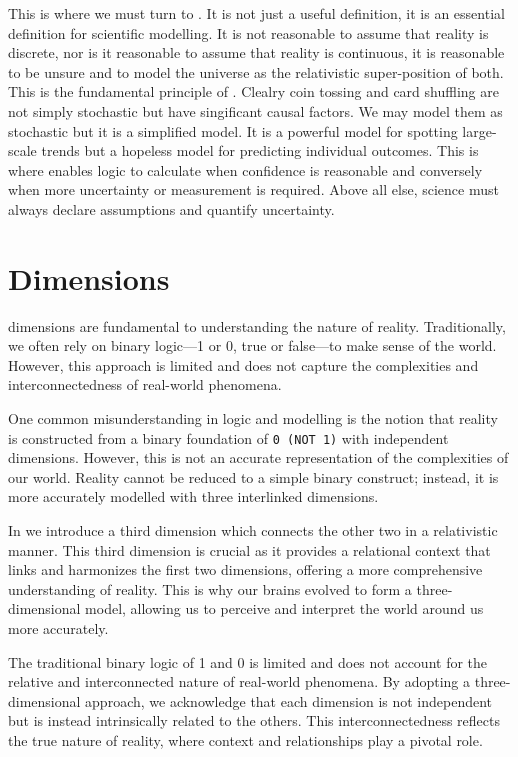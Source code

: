 \documentclass[12pt]{article}
\begin{document}
This is where we must turn to \qbit{}. It is not just a useful definition, it is an essential definition for scientific modelling. It is not reasonable to assume that reality is discrete, nor is it reasonable to assume that reality is continuous, it is reasonable to be unsure and to model the universe as the relativistic super-position of both. This is the fundamental principle of \iR{}. Clealry coin tossing and card shuffling are not simply stochastic but have singificant causal factors. We may model them as stochastic but it is a simplified model. It is a powerful model for spotting large-scale trends but a hopeless model for predicting individual outcomes. This is where \qbit{} enables logic to calculate when confidence is reasonable and conversely when more uncertainty or measurement is required. Above all else, science must always declare assumptions and quantify uncertainty.

\section*{\iR{} Dimensions}

\iR{} dimensions are fundamental to understanding the nature of reality. Traditionally, we often rely on binary logic—1 or 0, true or false—to make sense of the world. However, this approach is limited and does not capture the complexities and interconnectedness of real-world phenomena.

One common misunderstanding in logic and modelling is the notion that reality is constructed from a binary foundation of \texttt{0 (NOT 1)} with independent dimensions. However, this is not an accurate representation of the complexities of our world. Reality cannot be reduced to a simple binary construct; instead, it is more accurately modelled with three interlinked dimensions.

In \iR{} we introduce a third dimension which connects the other two in a relativistic manner. This third dimension is crucial as it provides a relational context that links and harmonizes the first two dimensions, offering a more comprehensive understanding of reality. This is why our brains evolved to form a three-dimensional model, allowing us to perceive and interpret the world around us more accurately.

The traditional binary logic of 1 and 0 is limited and does not account for the relative and interconnected nature of real-world phenomena. By adopting a three-dimensional approach, we acknowledge that each dimension is not independent but is instead intrinsically related to the others. This interconnectedness reflects the true nature of reality, where context and relationships play a pivotal role.
\end{document}
